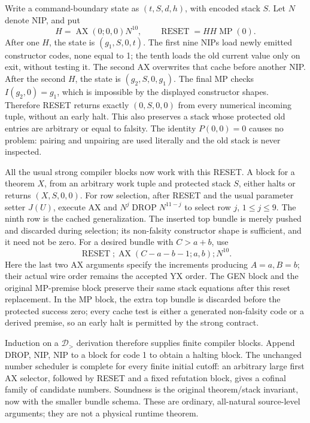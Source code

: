 Write a command-boundary state as \((t,S,d,h)\), with encoded stack
\(S\). Let \(N\) denote NIP, and put
\[
 H=\operatorname{AX}(0;0,0)N^{10},\qquad
               \operatorname{RESET}=HH\operatorname{MP}(0).
\]
After one \(H\), the state is \((g_1,S,0,t)\). The first nine NIPs
load newly emitted constructor codes, none equal to 1; the tenth loads
the old current value only on exit, without testing it. The second AX
overwrites that cache before another NIP. After the second \(H\), the
state is \((g_2,S,0,g_1)\). The final MP checks
\(I(g_2,0)=g_1\), which is impossible by the displayed constructor
shapes. Therefore RESET returns exactly \((0,S,0,0)\) from every
numerical incoming tuple, without an early halt. This also preserves a
stack whose protected old entries are arbitrary or equal to falsity.
The identity \(P(0,0)=0\) causes no problem: pairing and unpairing are
used literally and the old stack is never inspected.

All the usual strong compiler blocks now work with this RESET. A block
for a theorem \(X\), from an arbitrary work tuple and protected stack
\(S\), either halts or returns \((X,S,0,0)\). For row selection, after
RESET and the usual parameter setter \(J(U)\), execute AX and
\(N^j\operatorname{DROP}N^{11-j}\) to select row \(j\),
\(1\leq j\leq9\). The ninth row is the cached generalization.
The inserted top bundle is merely pushed and discarded during selection;
its non-falsity constructor shape is sufficient, and it need not be zero.
For a desired bundle with \(C>a+b\), use
\[
 \operatorname{RESET};\operatorname{AX}(C-a-b-1;a,b);N^{10}.
\]
Here the last two AX arguments specify the increments producing
\(A=a,B=b\); their actual wire order remains the accepted YX order.
The GEN block and the original MP-premise block preserve their same
stack equations after this reset replacement. In the MP block, the
extra top bundle is discarded before the protected success zero; every
cache test is either a generated non-falsity code or a derived premise,
so an early halt is permitted by the strong contract.

Induction on a \(\mathcal D_{>}\) derivation therefore supplies finite
compiler blocks. Append DROP, NIP, NIP to a block for code 1 to obtain a
halting block. The unchanged number scheduler is complete for every
finite initial cutoff: an arbitrary large first AX selector, followed
by RESET and a fixed refutation block, gives a cofinal family of
candidate numbers. Soundness is the original theorem/stack invariant,
now with the smaller bundle schema. These are ordinary, all-natural
source-level arguments; they are not a physical runtime theorem.

